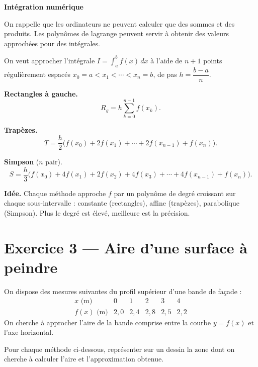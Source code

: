 \begin{mdframed}[backgroundcolor=ThemeLight, linecolor=Theme,
  linewidth=1.5pt, innertopmargin=10pt, innerbottommargin=10pt]
\textbf{\large Intégration numérique}

\medskip
On rappelle que les ordinateurs ne peuvent calculer que des sommes et des produits. Les polynômes de lagrange peuvent servir à obtenir des valeurs approchées pour des intégrales.

On veut approcher l'intégrale
$\displaystyle I = \int_a^b f(x)\,dx$
à l'aide de $n+1$ points régulièrement espacés
$x_0 = a < x_1 < \cdots < x_n = b$, de pas
$h = \dfrac{b-a}{n}$.

\medskip

\textbf{Rectangles à gauche.}
\[
  R_g = h \sum_{k=0}^{n-1} f(x_k).
\]

\textbf{Trapèzes.}
\[
  T = \frac{h}{2}\bigl(f(x_0) + 2f(x_1)
    + \cdots + 2f(x_{n-1}) + f(x_n)\bigr).
\]

\textbf{Simpson} ($n$ pair).
\[
  S = \frac{h}{3}\bigl(f(x_0) + 4f(x_1) + 2f(x_2)
    + 4f(x_3) + \cdots + 4f(x_{n-1}) + f(x_n)\bigr).
\]

\medskip

\textbf{Idée.}
Chaque méthode approche $f$ par un polynôme de degré
croissant sur chaque sous-intervalle :
constante (rectangles), affine (trapèzes), parabolique (Simpson).
Plus le degré est élevé, meilleure est la précision.
\end{mdframed}

\section*{Exercice 3 --- Aire d'une surface à peindre}

On dispose des mesures suivantes du profil supérieur
d'une bande de façade :
\[
\begin{array}{c|ccccc}
  x \text{ (m)}    & 0 & 1 & 2 & 3 & 4 \\
  \hline
  f(x) \text{ (m)} & 2{,}0 & 2{,}4 & 2{,}8 & 2{,}5 & 2{,}2
\end{array}
\]
On cherche à approcher l'aire de la bande comprise
entre la courbe $y=f(x)$ et l'axe horizontal.

Pour chaque méthode ci-dessous, représenter sur un dessin la zone dont on cherche à calculer l'aire et l'approximation obtenue.

